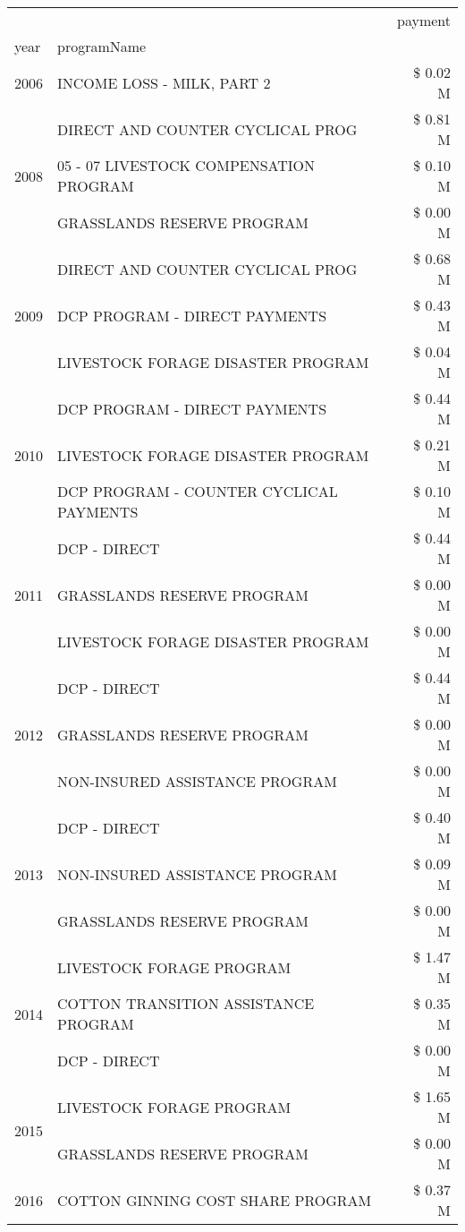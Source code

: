 \begin{tabular}{llr}
\toprule
 &  & payment \\
year & programName &  \\
\midrule
2006 & INCOME LOSS - MILK, PART 2 & \$ 0.02 M \\
\cline{1-3}
\multirow[t]{3}{*}{2008} & DIRECT AND COUNTER CYCLICAL PROG & \$ 0.81 M \\
 & 05 - 07 LIVESTOCK COMPENSATION PROGRAM & \$ 0.10 M \\
 & GRASSLANDS RESERVE PROGRAM & \$ 0.00 M \\
\cline{1-3}
\multirow[t]{3}{*}{2009} & DIRECT AND COUNTER CYCLICAL PROG & \$ 0.68 M \\
 & DCP PROGRAM - DIRECT PAYMENTS & \$ 0.43 M \\
 & LIVESTOCK FORAGE DISASTER  PROGRAM & \$ 0.04 M \\
\cline{1-3}
\multirow[t]{3}{*}{2010} & DCP PROGRAM - DIRECT PAYMENTS & \$ 0.44 M \\
 & LIVESTOCK FORAGE DISASTER  PROGRAM & \$ 0.21 M \\
 & DCP PROGRAM - COUNTER CYCLICAL PAYMENTS & \$ 0.10 M \\
\cline{1-3}
\multirow[t]{3}{*}{2011} & DCP - DIRECT & \$ 0.44 M \\
 & GRASSLANDS RESERVE PROGRAM & \$ 0.00 M \\
 & LIVESTOCK FORAGE DISASTER PROGRAM & \$ 0.00 M \\
\cline{1-3}
\multirow[t]{3}{*}{2012} & DCP - DIRECT & \$ 0.44 M \\
 & GRASSLANDS RESERVE PROGRAM & \$ 0.00 M \\
 & NON-INSURED ASSISTANCE PROGRAM & \$ 0.00 M \\
\cline{1-3}
\multirow[t]{3}{*}{2013} & DCP - DIRECT & \$ 0.40 M \\
 & NON-INSURED ASSISTANCE PROGRAM & \$ 0.09 M \\
 & GRASSLANDS RESERVE PROGRAM & \$ 0.00 M \\
\cline{1-3}
\multirow[t]{3}{*}{2014} & LIVESTOCK FORAGE PROGRAM & \$ 1.47 M \\
 & COTTON TRANSITION ASSISTANCE PROGRAM & \$ 0.35 M \\
 & DCP - DIRECT & \$ 0.00 M \\
\cline{1-3}
\multirow[t]{2}{*}{2015} & LIVESTOCK FORAGE PROGRAM & \$ 1.65 M \\
 & GRASSLANDS RESERVE PROGRAM & \$ 0.00 M \\
\cline{1-3}
\multirow[t]{3}{*}{2016} & COTTON GINNING COST SHARE PROGRAM             & \$ 0.37 M \\

\end{tabular}
